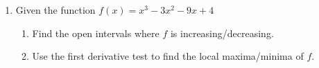 \documentclass[12pt]{article}
\begin{document}
 
\begin{enumerate}
    \item Given the function $f(x) = x^3-3x^2-9x+4$
\begin{enumerate}
    \item Find the open intervals where $f$ is increasing/decreasing.
    \vfill

    \item Use the first derivative test to find the local maxima/minima of $f$.
    \vfill
\end{enumerate}
\end{enumerate}
\end{document}
